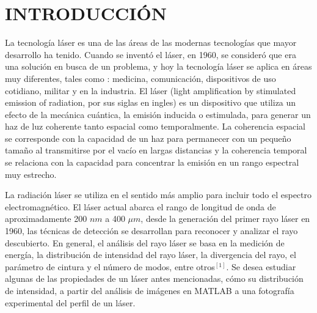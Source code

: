 \documentclass[11pt,letterpaper,twocolumn]{article}
\begin{document}
\section*{\normalsize{INTRODUCCIÓN}} 
La tecnología láser es una de las  áreas de las modernas tecnologías que mayor desarrollo ha tenido. Cuando se inventó el láser, en 1960, se consideró que era una solución en busca de un problema, y hoy la tecnología láser se aplica en áreas muy diferentes, tales como : medicina, comunicación, dispositivos de uso cotidiano, militar y en la  industria. El láser (light amplification by stimulated emission of radiation, por sus siglas en ingles) es un dispositivo que utiliza un efecto de la mecánica cuántica, la emisión inducida o estimulada, para generar un haz de luz coherente tanto espacial como temporalmente. La coherencia espacial se corresponde con la capacidad de un haz para permanecer con un pequeño tamaño al transmitirse por el vacío en largas distancias y la coherencia temporal se relaciona con la capacidad para concentrar la emisión en un rango espectral muy estrecho.\\
\par 
La radiación láser se utiliza en el sentido más amplio para incluir todo el espectro electromagnético. El láser actual abarca el rango de longitud de onda de aproximadamente 200 $nm$ a 400 $\mu m$, desde la generación del primer rayo láser en 1960, las técnicas de detección se desarrollan para reconocer y analizar el rayo descubierto. En general, el análisis del rayo láser se basa en la medición de energía, la distribución de intensidad del rayo láser, la divergencia del rayo, el parámetro de cintura y el número de modos, entre otros$^{[1]}$. Se desea estudiar algunas de las propiedades de un láser antes mencionadas, cómo su distribución de intensidad, a partir del análisis de imágenes en MATLAB a una fotografía experimental del perfil de un láser. 
\end{document}
